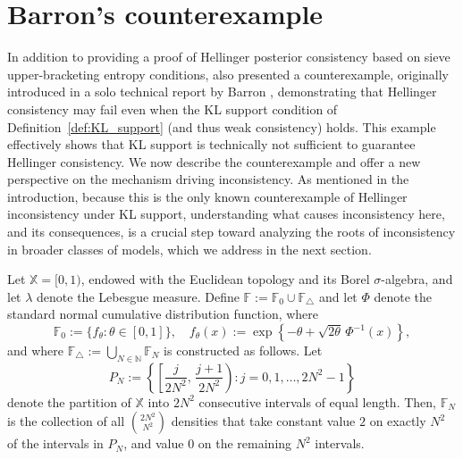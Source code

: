 \documentclass[11pt,twoside]{article}
\def\NN{\mathbb{N}}
\def\FF{\mathbb{F}}
\def\XX{\mathbb{X}}
\def\FF{\mathbb{F}}
\begin{document}
\section{Barron's counterexample}\label{sec:barron}


In addition to providing a proof of Hellinger posterior consistency based on sieve upper-bracketing entropy conditions, \cite{barron1999consistency} also presented a counterexample, originally introduced in a solo technical report by Barron \cite{barron1988exponential}, demonstrating that Hellinger consistency may fail even when the KL support condition of Definition~\ref{def:KL_support} (and thus weak consistency) holds. This example effectively shows that KL support is technically not sufficient to guarantee Hellinger consistency. We now describe the counterexample and offer a new perspective on the mechanism driving inconsistency. As mentioned in the introduction, because this is the only known counterexample of Hellinger inconsistency under KL support, understanding what causes inconsistency here, and its consequences, is a crucial step toward analyzing the roots of inconsistency in broader classes of models, which we address in the next section.

Let $\XX = [0,1)$, endowed with the Euclidean topology and its Borel $\sigma$-algebra, and let $\lambda$ denote the Lebesgue measure. Define $\FF := \FF_0 \cup \FF_\triangle$ and let $\Phi$ denote the standard normal cumulative distribution function, where
%
\begin{equation*}
    \FF_0 := \{f_\theta : \theta \in [0,1]\}, \quad f_\theta(x) := \exp\left\{-\theta + \sqrt{2\theta}\,\Phi^{-1}(x)\right\},
\end{equation*}
%
and where $\FF_\triangle := \bigcup_{N \in \NN} \FF_N$ is constructed as follows. Let
%
\begin{equation*}
    P_N := \left\{ \left[\frac{j}{2N^2},\, \frac{j+1}{2N^2} \right) : j = 0,1,\dots,2N^2 - 1 \right\}
\end{equation*}
%
denote the partition of $\XX$ into $2N^2$ consecutive intervals of equal length. Then, $\FF_N$ is the collection of all $\binom{2N^2}{N^2}$ densities that take constant value $2$ on exactly $N^2$ of the intervals in $P_N$, and value $0$ on the remaining $N^2$ intervals.
\end{document}

